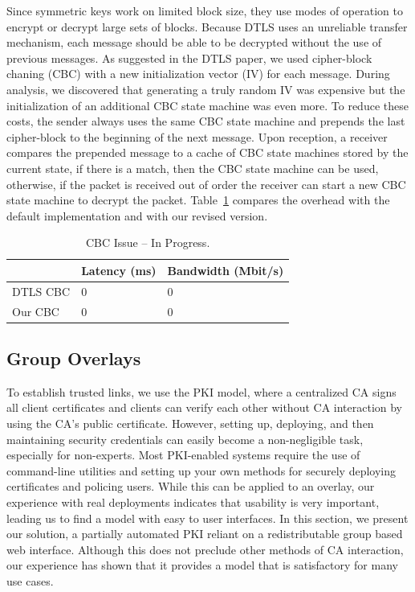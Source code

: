 \documentclass[conference]{IEEEtran}
\begin{document}
Since symmetric keys work on limited block size, they use modes of operation
to encrypt or decrypt large sets of blocks.  Because DTLS uses an unreliable
transfer mechanism, each message should be able to be decrypted without the use
of previous messages.  As suggested in the DTLS paper, we used cipher-block
chaning (CBC) with a new initialization vector (IV) for each message.  During
analysis, we discovered that generating a truly random IV was expensive but the
initialization of an additional CBC state machine was even more.  To reduce
these costs, the sender always uses the same CBC state machine and prepends
the last cipher-block to the beginning of the next message.  Upon reception,
a receiver compares the prepended message to a cache of CBC state machines
stored by the current state, if there is a match, then the CBC state machine
can be used, otherwise, if the packet is received out of order the receiver
can start a new CBC state machine to decrypt the packet.  Table~\ref{tab:cbc_issue}
compares the overhead with the default implementation and with our revised
version.

\begin{table}[h]
\setlength{\itemsep}{0pt}
\setlength{\parskip}{0pt}
\centering
\begin{tabular}[c]{|m{1.5cm}||m{3cm}|m{3cm}|} \hline
& Latency (ms) & Bandwidth (Mbit/s) \\ \hline\hline
DTLS CBC & 0 & 0 \\ \hline
Our CBC & 0 & 0 \\ \hline
\end{tabular}
\caption{CBC Issue -- In Progress.}
\label{tab:cbc_issue}
\end{table}

\subsection{Group Overlays}
\label{group_overlays}
To establish trusted links, we use the PKI model, where a centralized CA signs
all client certificates and clients can verify each other without CA interaction
by using the CA's public certificate.  However, setting up, deploying, and then
maintaining security credentials can easily become a non-negligible task,
especially for non-experts.  Most PKI-enabled systems require the use of
command-line utilities and setting up your own methods for securely
deploying certificates and policing users.  While this can be applied to an
overlay, our experience with real deployments indicates that usability is very
important, leading us to find a model with easy to user interfaces.
In this section, we present our solution, a partially automated PKI reliant on
a redistributable group based web interface.  Although this does not preclude
other methods of CA interaction, our experience has shown that it provides a
model that is satisfactory for many use cases.
\end{document}
